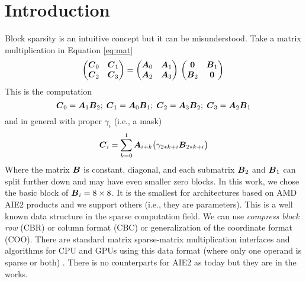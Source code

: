 \documentclass{IEEEtran}
\begin{document}





\section{Introduction}
\label{sec:introduction}
Block sparsity is an intuitive concept but it can be
misunderstood. Take a matrix multiplication in Equation \ref{eq:mat}
\begin{equation}
  \label{eq:mat}
  \begin{pmatrix}
    \Vc{C}_0 & \Vc{C}_1 \\
    \Vc{C}_2 & \Vc{C}_3 \\ 
  \end{pmatrix} = 
  \begin{pmatrix}
    \Vc{A}_0 & \Vc{A}_1 \\
    \Vc{A}_2 & \Vc{A}_3 \\ 
  \end{pmatrix}\\  \begin{pmatrix}
    \Vc{0}   & \Vc{B}_1 \\
    \Vc{B}_2 & \Vc{0} \\ 
  \end{pmatrix}\\
\end{equation}
This is the computation {\small \begin{equation} {\boldsymbol C}_0 = {\boldsymbol A}_{1}
    {\boldsymbol B}_{2}; \; {\boldsymbol C}_1 = {\boldsymbol A}_{0} {\boldsymbol B}_{1}; \; {\boldsymbol C}_2 =
    {\boldsymbol A}_{3} {\boldsymbol B}_{2}; \; {\boldsymbol C}_3 = {\boldsymbol A}_{2} {\boldsymbol B}_{1}
\end{equation}}
and in general with proper $\gamma_i$ (i.e., a mask)
\begin{equation}
  {\boldsymbol C}_i = \sum_{k=0}^1 {\boldsymbol A}_{i+ k} \big(\gamma_{2*k+i} {\boldsymbol B}_{2*k+i}\big)
\end{equation}
Where the matrix ${\boldsymbol B}$ is constant, diagonal, and each submatrix
${\boldsymbol B_2}$ and ${\boldsymbol B}_1$ can split further down and may have even
smaller zero blocks. In this work, we chose the basic block of
${\boldsymbol B}_i = 8\times 8$. It is the smallest for architectures based on
AMD AIE2 products and we support others (i.e., they are parameters).
This is a well known data structure in the sparse computation field.
We can use {\em compress block row} (CBR) or {\em }column format (CBC)
or generalization of the coordinate format (COO). There are standard
matrix sparse-matrix multiplication interfaces and algorithms for CPU
and GPUs using this data format (where only one operand is sparse or
both) \cite{rocSPARSE,cuSPARSE}. There is no counterparts for AIE2 as
today but they are in the works.
\end{document}
